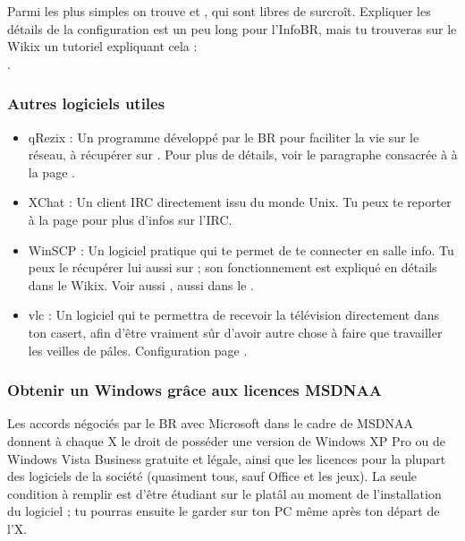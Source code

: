 Parmi les plus simples on trouve  et , qui sont libres de surcro\^{i}t. Expliquer les détails de la configuration est un peu long pour l'InfoBR, mais tu trouveras sur le Wikix un tutoriel expliquant cela : \\
.

\subsubsection{Autres logiciels utiles}

\begin{itemize}
  \item qRezix : Un programme développé par le BR pour faciliter la vie sur le réseau,
                  à récupérer sur \xshare. Pour plus de détails, voir le paragraphe consacrée
                  à  à la page \pageref{qrezix}.
  \item XChat : Un client IRC directement issu du monde Unix.
                 Tu peux te reporter à la page \pageref{irc} pour plus d'infos sur l'IRC.
  \item WinSCP : Un logiciel pratique qui te permet de te connecter en salle info.
                  Tu peux le récupérer lui aussi sur \xshare ;
                  son fonctionnement est expliqué en détails dans le Wikix. Voir aussi , aussi dans le \xshare.
  \item vlc : Un logiciel qui te permettra de recevoir la télévision directement dans ton casert, afin d'être vraiment s\^{u}r d'avoir autre chose à faire que travailler les veilles de p\^ales. Configuration page \pageref{TV}.
\end{itemize}


\subsubsection{Obtenir un Windows grâce aux licences MSDNAA}

\label{msdnaa} Les accords négociés par le BR avec Microsoft dans le cadre de MSDNAA donnent à chaque X le droit de posséder une version de Windows
XP Pro ou de Windows Vista Business gratuite et légale, ainsi que les licences pour la plupart des logiciels de la société (quasiment tous, sauf
Office et les jeux). La seule condition à remplir est d'être étudiant sur le platâl au moment de l'installation du logiciel ; tu pourras ensuite le
garder sur ton PC même après ton départ de l'X.


